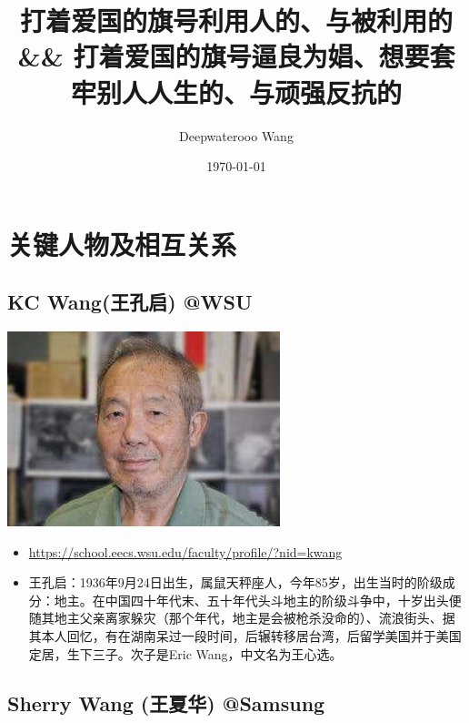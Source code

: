 \documentclass[9pt, b5paper]{article}
\author{Deepwaterooo Wang}
\date{\today}
\title{打着爱国的旗号利用人的、与被利用的 \&\& 打着爱国的旗号逼良为娼、想要套牢别人人生的、与顽强反抗的}
\begin{document}
\maketitle
\tableofcontents


\section{关键人物及相互关系}
\label{sec-1}
\subsection{KC Wang(王孔启) @WSU}
\label{sec-1-1}

\includegraphics[width=.9\linewidth]{./pic/KCWang.jpg}
\begin{itemize}
\item \url{https://school.eecs.wsu.edu/faculty/profile/?nid=kwang}
\item 王孔启：1936年9月24日出生，属鼠天秤座人，今年85岁，出生当时的阶级成分：地主。在中国四十年代末、五十年代头斗地主的阶级斗争中，十岁出头便随其地主父亲离家躲灾（那个年代，地主是会被枪杀没命的）、流浪街头、据其本人回忆，有在湖南呆过一段时间，后辗转移居台湾，后留学美国并于美国定居，生下三子。次子是Eric Wang，中文名为王心选。
\end{itemize}
\subsection{Sherry Wang (王夏华) @Samsung}
\label{sec-1-2}
\end{document}
